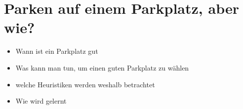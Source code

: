 \section{Parken auf einem Parkplatz, aber wie?}
\begin{itemize}
	\item Wann ist ein Parkplatz gut
	\item Was kann man tun, um einen guten Parkplatz zu wählen
	\item welche Heuristiken werden weshalb betrachtet
	\item Wie wird gelernt
\end{itemize}
